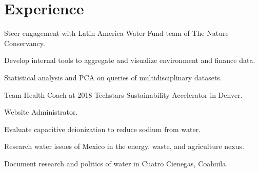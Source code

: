 \documentclass[letterpaper]{deedy-resume} %
\begin{document}
\begin{minipage}[t]{0.66\textwidth} %


\section{Experience}


\vspace{\topsep} %
\begin{tightitemize}
    \item Steer engagement with Latin America Water Fund team of The Nature Conservancy.
    \item Develop internal tools to aggregate and visualize environment and finance data.
    \item Statistical analysis and PCA on queries of multidisciplinary datasets. 
    \item Team Health Coach at 2018 Techstars Sustainability Accelerator in Denver.

\end{tightitemize}

\sectionspace %



\begin{tightitemize}
    \item Website Administrator.
    \item Evaluate capacitive deionization to reduce sodium from water.
    \item Research water issues of Mexico in the energy, waste, and agriculture nexus.
    \item Document research and politics of water in Cuatro Cienegas, Coahuila. 

\end{tightitemize}

\sectionspace %



\end{minipage}
\end{document}
